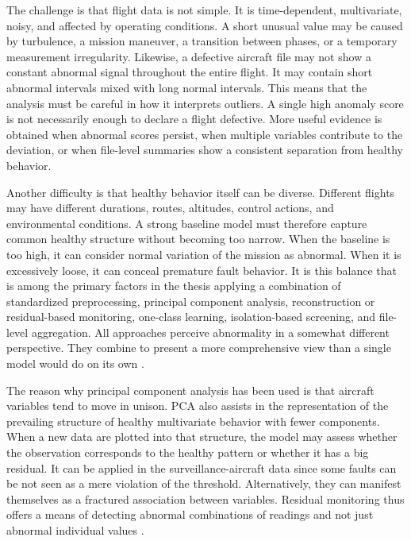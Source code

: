 \documentclass[12pt,a4paper]{report}
\begin{document}
	The challenge is that flight data is not simple. It is time-dependent, multivariate, noisy, and affected by operating conditions. A short unusual value may be caused by turbulence, a mission maneuver, a transition between phases, or a temporary measurement irregularity. Likewise, a defective aircraft file may not show a constant abnormal signal throughout the entire flight. It may contain short abnormal intervals mixed with long normal intervals. This means that the analysis must be careful in how it interprets outliers. A single high anomaly score is not necessarily enough to declare a flight defective. More useful evidence is obtained when abnormal scores persist, when multiple variables contribute to the deviation, or when file-level summaries show a consistent separation from healthy behavior.
	
	Another difficulty is that healthy behavior itself can be diverse. Different flights may have different durations, routes, altitudes, control actions, and environmental conditions. A strong baseline model must therefore capture common healthy structure without becoming too narrow. When the baseline is too high, it can consider normal variation of the mission as abnormal. When it is excessively loose, it can conceal premature fault behavior. It is this balance that is among the primary factors in the thesis applying a combination of standardized preprocessing, principal component analysis, reconstruction or residual-based monitoring, one-class learning, isolation-based screening, and file-level aggregation. All approaches perceive abnormality in a somewhat different perspective. They combine to present a more comprehensive view than a single model would do on its own \cite{macgregor1995spc,scholkopf2001ocsvm,liu2008iforest}.
	
	The reason why principal component analysis has been used is that aircraft variables tend to move in unison. PCA also assists in the representation of the prevailing structure of healthy multivariate behavior with fewer components. When a new data are plotted into that structure, the model may assess whether the observation corresponds to the healthy pattern or whether it has a big residual. It can be applied in the surveillance-aircraft data since some faults can be not seen as a mere violation of the threshold. Alternatively, they can manifest themselves as a fractured association between variables. Residual monitoring thus offers a means of detecting abnormal combinations of readings and not just abnormal individual values \cite{macgregor1994overview,kourti1995batch,westerhuis2000contrib}.
	
\end{document}
